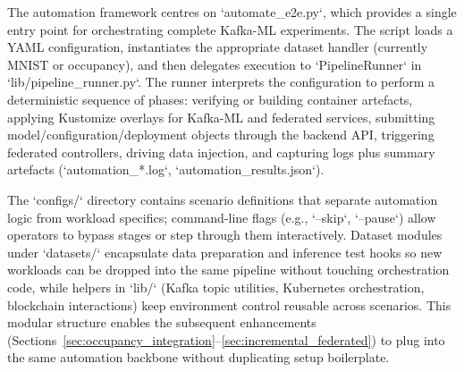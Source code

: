 The automation framework centres on `automate\_e2e.py`, which provides a single entry point for orchestrating complete Kafka-ML experiments. The script loads a YAML configuration, instantiates the appropriate dataset handler (currently MNIST or occupancy), and then delegates execution to `PipelineRunner` in `lib/pipeline_runner.py`. The runner interprets the configuration to perform a deterministic sequence of phases: verifying or building container artefacts, applying Kustomize overlays for Kafka-ML and federated services, submitting model/configuration/deployment objects through the backend API, triggering federated controllers, driving data injection, and capturing logs plus summary artefacts (`automation_*.log`, `automation_results.json`).

The `configs/` directory contains scenario definitions that separate automation logic from workload specifics; command-line flags (e.g., `--skip`, `--pause`) allow operators to bypass stages or step through them interactively. Dataset modules under `datasets/` encapsulate data preparation and inference test hooks so new workloads can be dropped into the same pipeline without touching orchestration code, while helpers in `lib/` (Kafka topic utilities, Kubernetes orchestration, blockchain interactions) keep environment control reusable across scenarios. This modular structure enables the subsequent enhancements (Sections~\ref{sec:occupancy_integration}--\ref{sec:incremental_federated}) to plug into the same automation backbone without duplicating setup boilerplate.


